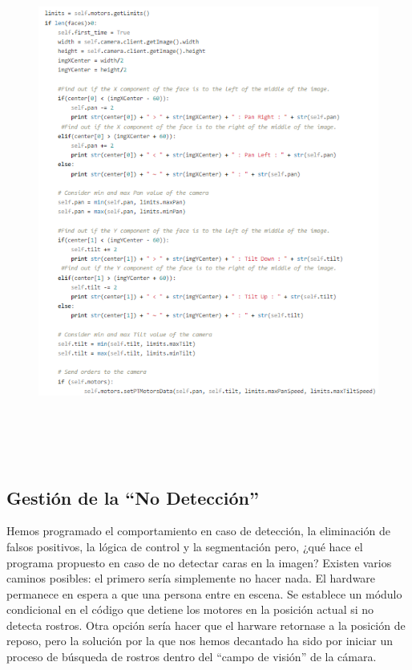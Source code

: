 \begin{figure}[H]
  \begin{center}
    \includegraphics[width=0.98\linewidth, height=17cm]{figures/snippet1ff.png}
		\label{fig.snippet1ff}
		\end{center}
\end{figure}

\subsection{Gestión de la ``No Detección''}
Hemos programado el comportamiento en caso de detección, la eliminación de falsos positivos, la lógica de control y la segmentación pero, ¿qué hace el programa propuesto en caso de no detectar caras en la imagen? Existen varios caminos posibles: el primero sería simplemente no hacer nada. El hardware permanece en espera a que una persona entre en escena. Se establece un módulo condicional en el código que detiene los motores en la posición actual si no detecta rostros. Otra opción sería hacer que el harware retornase a la posición de reposo, pero la solución por la que nos hemos decantado ha sido por iniciar un proceso de búsqueda de rostros dentro del “campo de visión” de la cámara. 

